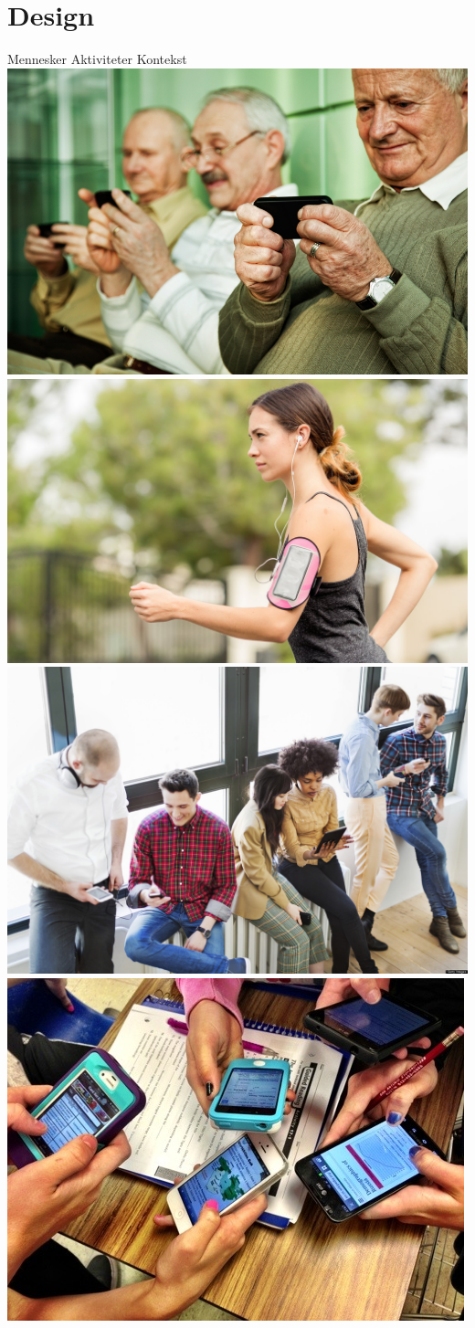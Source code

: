 \documentclass[10pt]{beamer}
\begin{document}
\section{Design}
\begin{frame}{Mennesker Aktiviteter Kontekst}
		\centering
	\includegraphics[width=.45\linewidth]{img/elderly.jpg}\quad%
	\includegraphics[width=.45\linewidth]{img/running.jpg}\quad%
	\includegraphics[width=.45\linewidth]{img/people.jpg}\quad%
	\includegraphics[width=.45\linewidth]{img/smartphones_inclass}
\end{frame}
\end{document}
